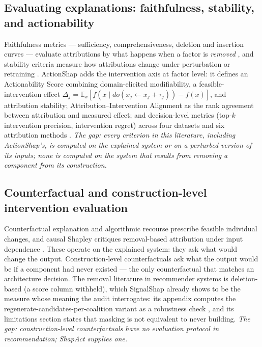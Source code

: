 \documentclass[pdflatex,sn-mathphys-num]{sn-jnl}
\theoremstyle{thmstyleone}%
\theoremstyle{thmstyletwo}%
\theoremstyle{thmstylethree}%
\begin{document}
\subsection{Evaluating explanations: faithfulness, stability, and actionability}\label{subsec2_2}

Faithfulness metrics --- sufficiency, comprehensiveness, deletion and insertion curves --- evaluate attributions by what happens when a factor is \emph{removed} \cite{deyoung2020,hooker2019,covert2021}, and stability criteria measure how attributions change under perturbation or retraining \cite{alvarezmelis2018,nesmaoui2026drift}. ActionShap adds the intervention axis at factor level: it defines an Actionability Score combining domain-elicited modifiability, a feasible-intervention effect $\Delta_j = \mathbb{E}_x[f(x \mid do(x_j \leftarrow x_j + \tau_j)) - f(x)]$, and attribution stability; Attribution--Intervention Alignment as the rank agreement between attribution and measured effect; and decision-level metrics (top-$k$ intervention precision, intervention regret) across four datasets and six attribution methods \cite{louhichi2026actionshap}. \emph{The gap: every criterion in this literature, including ActionShap's, is computed on the explained system or on a perturbed version of its inputs; none is computed on the system that results from removing a component from its construction.}

\subsection{Counterfactual and construction-level intervention evaluation}\label{subsec2_3}

Counterfactual explanation \cite{wachter2017} and algorithmic recourse \cite{ustun2019,karimi2021} prescribe feasible individual changes, and causal Shapley critiques removal-based attribution under input dependence \cite{janzing2020}. These operate on the explained system: they ask what would change the output. Construction-level counterfactuals ask what the output would be if a component had never existed --- the only counterfactual that matches an architecture decision. The removal literature in recommender systems is deletion-based (a score column withheld), which SignalShap already shows to be the measure whose meaning the audit interrogates: its appendix computes the regenerate-candidates-per-coalition variant as a robustness check \cite{louhichi2026signalshap}, and its limitations section states that masking is not equivalent to never building. \emph{The gap: construction-level counterfactuals have no evaluation protocol in recommendation; ShapAct supplies one.}
\end{document}
